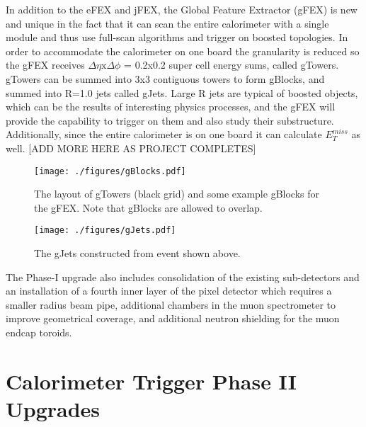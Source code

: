 In addition to the eFEX and jFEX, the Global Feature Extractor (gFEX) is new and unique in the fact that it can scan the entire calorimeter with a single module and thus use full-scan algorithms and trigger on boosted topologies.  In order to accommodate the calorimeter on one board the granularity is reduced so the gFEX receives $\Delta\eta \mathrm{x} \Delta\phi$ = 0.2x0.2 super cell energy sums, called gTowers.  gTowers can be summed into 3x3 contiguous towers to form gBlocks, and summed into R=1.0 jets called gJets.  Large R jets are typical of boosted objects, which can be the results of interesting physics processes, and the gFEX will provide the capability to trigger on them and also study their substructure.  Additionally, since the entire calorimeter is on one board it can calculate $E_{T}^{miss}$ as well.  [ADD MORE HERE AS PROJECT COMPLETES]

\begin{figure}[h!]
  \centering
	\texttt{[image: ./figures/gBlocks.pdf]}
\caption{\label{fig:gBlocks}{ The layout of gTowers (black grid) and some example gBlocks for the gFEX.  Note that gBlocks are allowed to overlap. }} %
\end{figure}

\begin{figure}[h!]
  \centering
	\texttt{[image: ./figures/gJets.pdf]}
\caption{\label{fig:gJets}{ The gJets constructed from event shown above. }} %
\end{figure}

The Phase-I upgrade also includes consolidation of the existing sub-detectors and an installation of a fourth inner layer of the pixel detector which requires a smaller radius beam pipe, additional chambers in the muon spectrometer to improve geometrical coverage, and additional neutron shielding for the muon endcap toroids.  



\section{Calorimeter Trigger Phase II Upgrades}


